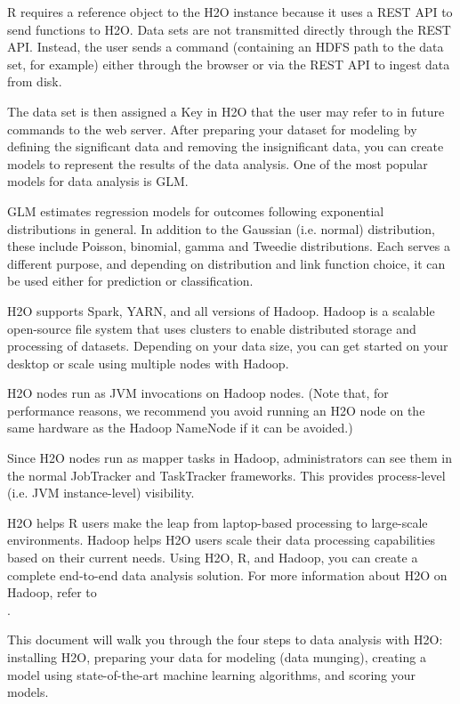 \documentclass[11pt]{article}
\begin{document}
R requires a reference object to the H2O instance because it uses a REST API to send functions to H2O. Data sets are not transmitted directly through the REST API. Instead, the user sends a command (containing an HDFS path to the data set, for example) either through the browser or via the REST API to ingest data from disk.

The data set is then assigned a Key in H2O that the user may refer to in future commands to the web server. After preparing your dataset for modeling by defining the significant data and removing the insignificant data, you can create models to represent the results of the data analysis. One of the most popular models for data analysis is GLM. 

GLM estimates regression models for outcomes following exponential distributions in general. In addition to the Gaussian (i.e. normal) distribution, these include Poisson, binomial, gamma and Tweedie distributions. Each serves a different purpose, and depending on distribution and link function choice, it can be used either for prediction or classification.

H2O supports Spark, YARN, and all versions of Hadoop. Hadoop is a scalable open-source file system that uses clusters to enable distributed storage and processing of datasets. Depending on your data size, you can get started on your desktop or scale using multiple nodes with Hadoop. 

H2O nodes run as JVM invocations on Hadoop nodes. (Note that, for performance reasons, we recommend you avoid running an H2O node on the same hardware as the Hadoop NameNode if it can be avoided.)

Since H2O nodes run as mapper tasks in Hadoop, administrators can see them in the normal JobTracker and TaskTracker frameworks. This provides process-level (i.e. JVM instance-level) visibility.

H2O helps R users make the leap from laptop-based processing to large-scale environments. Hadoop helps H2O users scale their data processing capabilities based on their current needs. Using H2O, R, and Hadoop, you can create a complete end-to-end data analysis solution. For more information about H2O on Hadoop, refer to \\.

This document will walk you through the four steps to data analysis with H2O: installing H2O, preparing your data for modeling (data munging), creating a model using state-of-the-art machine learning algorithms, and scoring your models. 
\end{document}
